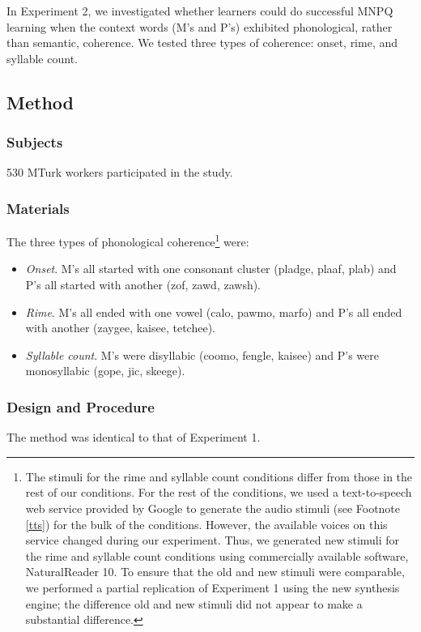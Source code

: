 \documentclass[man,floatsintext]{apa6}
\begin{document}
In Experiment 2, we investigated whether learners could do successful
MNPQ learning when the context words (M's and P's) exhibited
phonological, rather than semantic, coherence. We tested three types
of coherence: onset, rime, and syllable count.

\subsection{Method}
\subsubsection{Subjects} 530 MTurk workers participated in the study.
\subsubsection{Materials} The three types of phonological
coherence\footnote{\label{change-of-stimuli} The stimuli for the rime
and syllable count conditions differ from those in the rest of our
conditions. For the rest of the conditions, we used a text-to-speech
web service provided by Google to generate the audio stimuli (see
Footnote \ref{tts}) for the bulk of the conditions. However, the
available voices on this service changed during our experiment. Thus,
we generated new stimuli for the rime and syllable count conditions
using commercially available software, NaturalReader 10. To ensure
that the old and new stimuli were comparable, we performed a partial
replication of Experiment 1 using the new synthesis engine; the
difference old and new stimuli did not appear to make a substantial
difference.} were:
\begin{itemize}
\item \emph{Onset}. M's all started with one consonant cluster
(pladge, plaaf, plab) and P's all started with another (zof, zawd,
zawsh).
\item \emph{Rime}. M's all ended with one vowel (calo, pawmo, marfo)
and P's all ended with another (zaygee, kaisee, tetchee).
\item \emph{Syllable count}. M's were disyllabic (coomo, fengle,
kaisee) and P's were monosyllabic (gope, jic, skeege).
\end{itemize}

\subsubsection{Design and Procedure} The method was identical to that
of Experiment 1.
\end{document}
